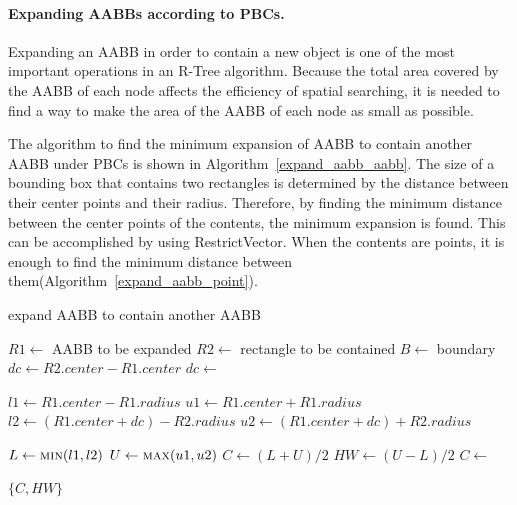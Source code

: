 \documentclass[10pt,letterpaper,twocolumn]{article}
\begin{document}
\paragraph{Expanding AABBs according to PBCs.}
Expanding an AABB in order to contain a new object is one of the most
important operations in an R-Tree algorithm.
Because the total area covered by the AABB of each node affects the efficiency
of spatial searching, it is needed to find a way to make the area of the AABB
of each node as small as possible.

The algorithm to find the minimum expansion of AABB to contain another AABB
under PBCs is shown in Algorithm~\ref{expand_aabb_aabb}.
The size of a bounding box that contains two rectangles is determined by the
distance between their center points and their radius.
Therefore, by finding the minimum distance between the center points of the contents,
the minimum expansion is found. This can be accomplished by using RestrictVector.
When the contents are points, it is enough to find the minimum distance between
them(Algorithm~\ref{expand_aabb_point}).

\begin{algorithm}[tb]
    \caption{expand AABB to contain another AABB}
    \label{expand_aabb_aabb}
    \begin{algorithmic}
        \State $R1 \gets$ AABB to be expanded
        \State $R2 \gets$ rectangle to be contained
        \State $B  \gets$ boundary
            \State $dc \gets R2.center - R1.center$
            \State $dc \gets$ 

            \State $l1 \gets R1.center - R1.radius$
            \State $u1 \gets R1.center + R1.radius$
            \State $l2 \gets (R1.center + dc) - R2.radius$
            \State $u2 \gets (R1.center + dc) + R2.radius$

            \State $L  \gets \Call{min}{l1, l2}$
            \State $U  \gets \Call{max}{u1, u2}$
            \State $C  \gets (L + U) / 2$
            \State $HW \gets (U - L) / 2$
            \State $C  \gets$ 

            \State \Return $\{C, HW\}$
        \EndFunction
     \end{algorithmic}
\end{algorithm}
\end{document}
